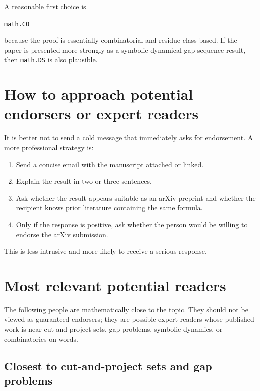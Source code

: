 \documentclass[11pt]{article}
\begin{document}
A reasonable first choice is

\begin{center}
\texttt{math.CO}
\end{center}

because the proof is essentially combinatorial and residue-class based.
If the paper is presented more strongly as a symbolic-dynamical gap-sequence
result, then \texttt{math.DS} is also plausible.

\section*{How to approach potential endorsers or expert readers}

It is better not to send a cold message that immediately asks for endorsement.
A more professional strategy is:

\begin{enumerate}
    \item Send a concise email with the manuscript attached or linked.
    \item Explain the result in two or three sentences.
    \item Ask whether the result appears suitable as an arXiv preprint and
    whether the recipient knows prior literature containing the same formula.
    \item Only if the response is positive, ask whether the person would be
    willing to endorse the arXiv submission.
\end{enumerate}

This is less intrusive and more likely to receive a serious response.

\section*{Most relevant potential readers}

The following people are mathematically close to the topic.  They should not
be viewed as guaranteed endorsers; they are possible expert readers whose
published work is near cut-and-project sets, gap problems, symbolic dynamics,
or combinatorics on words.

\subsection*{Closest to cut-and-project sets and gap problems}
\end{document}
